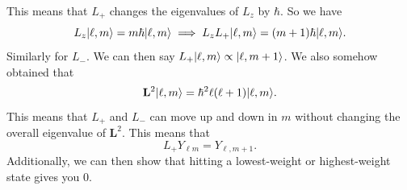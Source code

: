 This means that $L_+$ changes the eigenvalues of $L_z$ by $\hbar $. So we have
\[
	L_z\lvert\ell ,m\rangle =m\hbar \lvert\ell ,m\rangle \implies L_zL_+\lvert\ell ,m\rangle =(m+1)\hbar \lvert\ell ,m\rangle 
.\]
Similarly for $L_-$. We can then say $L_+\lvert\ell ,m\rangle \propto \lvert\ell ,m+1\rangle $. We also somehow obtained that
\[
	\mathbf{L} ^2\lvert\ell ,m\rangle =\hbar ^2 \ell (\ell +1)\lvert\ell ,m\rangle 
.\]
This means that $L_+$ and $L_-$ can move up and down in $m$ without changing the overall eigenvalue of $\mathbf{L} ^2$. This means that
\[
	L_+ Y_{\ell m} =Y_{\ell ,m+1} 
.\]
Additionally, we can then show that hitting a lowest-weight or highest-weight state gives you 0. 
